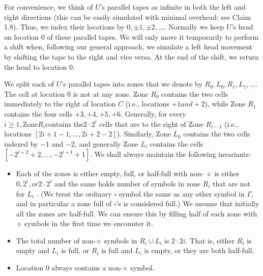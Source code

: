 \documentclass[a4paper]{article}
\begin{document}
	For convenience, we think of $U$’s parallel tapes as infinite in both the left and right
directions (this can be easily simulated with minimal overhead: see Claim 1.8). Thus, we
index their locations by $0, \pm 1, \pm 2, \dotsc $. Normally we keep $U$’s head on location 0 of these
parallel tapes. We will only move it temporarily to perform a shift when, following our
general approach, we simulate a left head movement by shifting the tape to the right
and vice versa. At the end of the shift, we return the head to location 0.

	We split each of $U$’s parallel tapes into zones that we denote by
$R_0 , L_0 , R_1 , L_1 , \dotsc$. The cell at location 0 is not at any zone. Zone $R_0$ contains the two cells immediately to the right of location \(C\) (i.e.,
locations \(+1 and +2\)), while Zone \(R_1\) contains the four cells \(+3, +4, +5, +6\). Generally,
for every \(i ≥ 1, \text{Zone} R_i \text{contains the} 2 \cdot 2^i\) cells that are to the right of Zone $R_{i−1}$ (i.e.,
locations \([2 i+1 − 1, . . . , 2 i+2 − 2]\)). Similarly, Zone $L_0$ contains the two cells indexed by
−1 and −2, and generally Zone $L_i$ contains the cells $[−2^{i+2} + 2, \dotsc , −2^{i+1} + 1]$. We
shall always maintain the following invariants:
\begin{itemize}
\item Each of the zones is either empty, full, or half-full with non- 
$\diamond$ is either \(0, 2^i , or 2 \cdot 2^i\) and the same holds
number of symbols in zone $R_i$ that are not 
for $L_i$ . (We treat the ordinary $\square$ symbol the same as any other symbol in $\Gamma$, and in
particular a zone full of  $\square$’s is considered full.) We assume that initially all the zones are half-full. We can ensure this by filling half of each zone with $\diamond$ symbols in the first time we encounter it.
\item The total number of non-$\diamond$ symbols in $R_i \cup L_i$ is $2 \cdot 2 i$. That is, either $R_i$ is empty and $L_i$ is full, or $R_i$ is full and $L_i$ is empty, or they are both half-full.
\item Location 0 always contains a non-$\diamond$ symbol.
\end{itemize}
\end{document}
